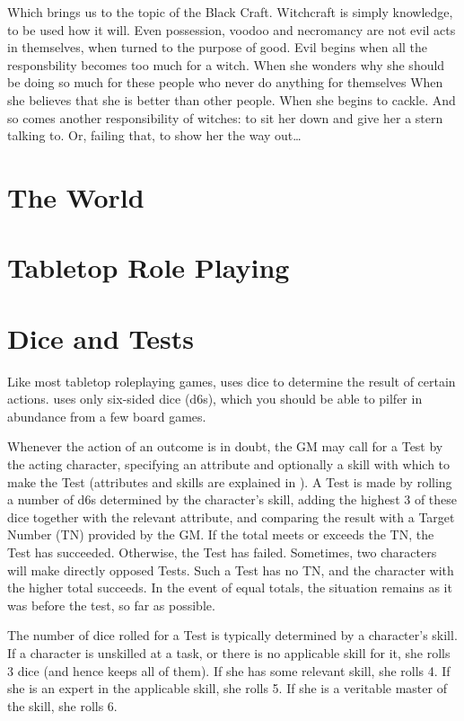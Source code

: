 Which brings us to the topic of the Black Craft.
Witchcraft is simply knowledge, to be used how it will.
Even possession, voodoo and necromancy are not evil acts in themselves, when turned to the purpose of good.
Evil begins when all the responsbility becomes too much for a witch.
When she wonders why she should be doing so much for these people who never do anything for themselves
When she believes that she is better than other people.
When she begins to cackle.
And so comes another responsibility of witches: to sit her down and give her a stern talking to.
Or, failing that, to show her the way out\dots

\section{The World}


\section{Tabletop Role Playing}

\section{Dice and Tests}

Like most tabletop roleplaying games,  uses dice to determine the result of certain actions.
 uses only six-sided dice (d6s), which you should be able to pilfer in abundance from a few board games.

Whenever the action of an outcome is in doubt, the GM may call for a Test by the acting character, specifying an attribute and optionally a skill with which to make the Test (attributes and skills are explained in ).
A Test is made by rolling a number of d6s determined by the character's skill, adding the highest 3 of these dice together with the relevant attribute, and comparing the result with a Target Number (TN) provided by the GM.
If the total meets or exceeds the TN, the Test has succeeded.
Otherwise, the Test has failed.
Sometimes, two characters will make directly opposed Tests.
Such a Test has no TN, and the character with the higher total succeeds.
In the event of equal totals, the situation remains as it was before the test, so far as possible.

The number of dice rolled for a Test is typically determined by a character's skill.
If a character is unskilled at a task, or there is no applicable skill for it, she rolls 3 dice (and hence keeps all of them).
If she has some relevant skill, she rolls 4.
If she is an expert in the applicable skill, she rolls 5.
If she is a veritable master of the skill, she rolls 6.

